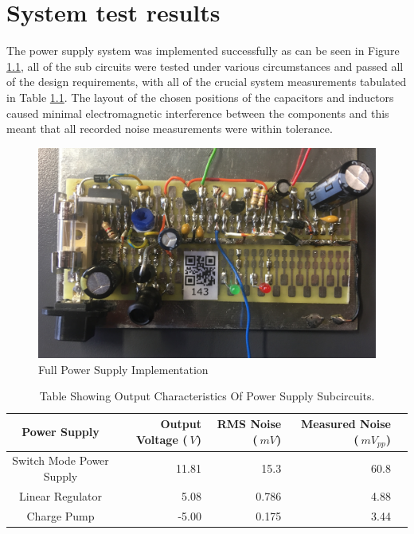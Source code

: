 \chapter{System test results}
The power supply system was implemented successfully as can be seen in Figure \ref{fig:full_circuit}, all of the sub circuits were tested under various circumstances and passed all of the design requirements, with all of the crucial system measurements tabulated in Table \ref{tab:powersupplytable}. The layout of the chosen positions of the capacitors and inductors caused minimal electromagnetic interference between the components and this meant that all recorded noise measurements were within tolerance.


 \begin{figure}
    \centering
    \includegraphics[width = 0.6\linewidth]{Figures/full_circuit.jpg}
    \caption{Full Power Supply Implementation}
    \label{fig:full_circuit}
\end{figure}

\begin{table}
        \centering
        \footnotesize
        \caption{Table Showing Output Characteristics Of Power Supply Subcircuits.}
         \begin{tabular}{c@{\qquad}rrrr}
          \toprule
           Power Supply & Output Voltage ($\SI{}{V}$) & RMS Noise ($\SI{}{mV}$) & Measured Noise ($\SI{}{mV_{pp}}$)\\
           \midrule
            Switch Mode Power Supply & 11.81    & 15.3      & 60.8  \\
            Linear Regulator         & 5.08     & 0.786     & 4.88  \\
            Charge Pump              & -5.00    & 0.175     & 3.44 \\
          \bottomrule
        \end{tabular}
     \label{tab:powersupplytable}
\end{table}





